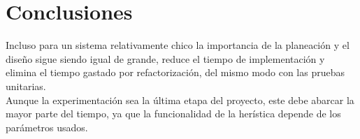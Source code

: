 \documentclass[a4paper]{article}
\begin{document}
%
\section*{Conclusiones}
Incluso para un sistema relativamente chico la importancia de la planeaci\'on y el diseño  sigue siendo igual de grande, reduce el tiempo de implementaci\'on y elimina el tiempo gastado por refactorizaci\'on, del mismo modo con las pruebas unitarias.   \\

Aunque la experimentaci\'on sea la \'ultima etapa del proyecto, este debe abarcar la mayor parte del tiempo, ya que la funcionalidad de la her\'istica depende de los par\'ametros usados.

{}

\end{document}

